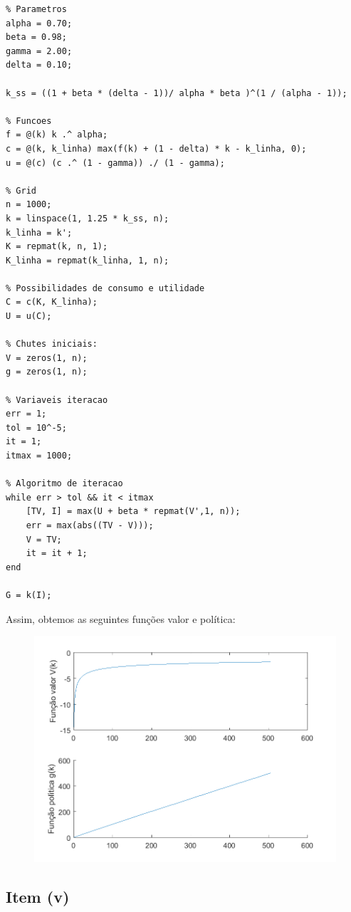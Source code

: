 \documentclass{article}
\begin{document}
\begin{lstlisting}
% Parametros
alpha = 0.70;
beta = 0.98;
gamma = 2.00;
delta = 0.10;

k_ss = ((1 + beta * (delta - 1))/ alpha * beta )^(1 / (alpha - 1));

% Funcoes
f = @(k) k .^ alpha;
c = @(k, k_linha) max(f(k) + (1 - delta) * k - k_linha, 0);
u = @(c) (c .^ (1 - gamma)) ./ (1 - gamma);

% Grid
n = 1000;
k = linspace(1, 1.25 * k_ss, n);
k_linha = k';
K = repmat(k, n, 1);
K_linha = repmat(k_linha, 1, n);

% Possibilidades de consumo e utilidade
C = c(K, K_linha);
U = u(C);

% Chutes iniciais:
V = zeros(1, n);
g = zeros(1, n);

% Variaveis iteracao
err = 1;
tol = 10^-5;
it = 1;
itmax = 1000;

% Algoritmo de iteracao
while err > tol && it < itmax
    [TV, I] = max(U + beta * repmat(V',1, n));
    err = max(abs((TV - V)));
    V = TV;
    it = it + 1;
end

G = k(I);
\end{lstlisting}

Assim, obtemos as seguintes funções valor e política:

\begin{figure}[!h]
  \includegraphics[scale=0.6]{ex2/ex2_1.png}
\end{figure}

\subsection*{Item (v)}
\end{document}
